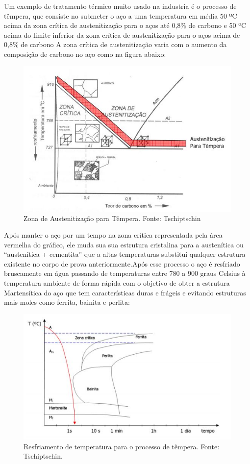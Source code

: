 Um exemplo de tratamento térmico muito usado na industria é o processo de têmpera, que consiste no submeter o aço a uma temperatura em média 50 ºC acima da zona crítica de austenitização para o aços até 0,8\% de carbono e 50 ºC acima do limite inferior da zona crítica de austenitização para o aços acima de 0,8\% de carbono A zona crítica de austenitização varia com o aumento da composição de carbono no aço como na figura abaixo:
\begin{figure}[H]
	\centering
	\label{austenitizacao}
	\includegraphics[keepaspectratio=true,scale=0.8]{figuras/austenitizacao.JPG}
	\caption{Zona de Austenitização para Têmpera. Fonte: Tschiptschin}
\end{figure}

Após manter o aço por um tempo  na zona crítica representada pela área vermelha do gráfico, ele muda sua sua estrutura cristalina para a austenítica ou “austenítica + cementita” que a altas temperaturas substituí qualquer estrutura existente no corpo de prova anteriormente.Após esse processo o aço é resfriado bruscamente em água passando de temperaturas entre 780 a 900 graus Celsius à temperatura ambiente de forma rápida com o objetivo de obter a estrutura Martensítica do aço que tem características duras e frágeis e evitando estruturas mais moles como ferrita, bainita e perlita:
\begin{figure}[H]
	\centering
	\label{resfriamento1}
	\includegraphics[keepaspectratio=true,scale=0.8]{figuras/resfriamento1.JPG}
	\caption{Resfriamento de temperatura para o processo de têmpera. Fonte: Tschiptschin.}
\end{figure}

